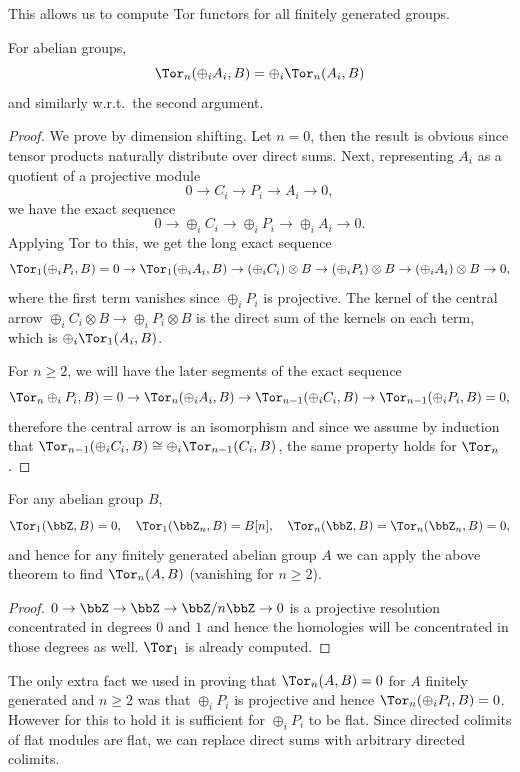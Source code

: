 This allows us to compute Tor functors for all finitely generated groups.

\begin{thm}
    For abelian groups,
    \[\Tor_n(\oplus_i A_i,B)=\oplus_i \Tor_n(A_i,B)\]
    and similarly w.r.t.\ the second argument.
\end{thm}
\begin{proof}
    We prove by dimension shifting. Let $n=0$, then the result is obvious since tensor products naturally distribute over direct sums.
     Next, representing $A_i$ as a quotient of a projective module
     \[0\to C_i\to P_i\to A_i\to 0,\]
     we have the exact sequence
     \[0\to \oplus_i C_i\to \oplus_i P_i\to \oplus_i A_i\to 0.\]
     Applying Tor to this, we get the long exact sequence
     \[\Tor_1(\oplus_i P_i,B)=0\to\Tor_1(\oplus_i A_i,B)\to (\oplus_i C_i)\otimes B\to (\oplus_i P_i)\otimes B\to (\oplus_i A_i)\otimes B\to 0,\]
     where the first term vanishes since $\oplus_i P_i$ is projective. The kernel of the central arrow $\oplus_i C_i\otimes B\to \oplus_i P_i\otimes B$ is the direct sum of the kernels on each term, which is $\oplus_i\Tor_1(A_i,B)$.

     For $n\geq 2$, we will have the later segments of the exact sequence
     \[\Tor_n\oplus_i P_i,B)=0\to \Tor_n(\oplus_iA_i,B)\to \Tor_{n-1}(\oplus_iC_i,B)\to \Tor_{n-1}(\oplus_i P_i,B)=0,\]
     therefore the central arrow is an isomorphism and since we assume by induction that $\Tor_{n-1}(\oplus_iC_i,B)\cong\oplus_i\Tor_{n-1}(C_i,B)$, the same property holds for $\Tor_n$.
\end{proof}
\begin{cor}
    For any abelian group $B$,
    \[\Tor_1(\bbZ,B)=0,\quad \Tor_1(\bbZ_n,B)=B[n],\quad \Tor_n(\bbZ,B)=\Tor_n(\bbZ_n,B)=0,\]
    and hence for any finitely generated abelian group $A$ we can apply the above theorem to find $\Tor_n(A,B)$ (vanishing for $n\geq 2$).
\end{cor}
\begin{proof}
    $0\to \bbZ\to \bbZ\to \bbZ\slash n\bbZ \to 0$ is a projective resolution concentrated in degrees $0$ and $1$ and hence the homologies will be concentrated in those degrees as well. $\Tor_1$ is already computed.
\end{proof}

The only extra fact we used in proving that $\Tor_n(A,B)=0$ for $A$ finitely generated and $n\geq 2$ was that $\oplus_i P_i$ is projective and hence $\Tor_n(\oplus_i P_i,B)=0$. However for this to hold it is sufficient for $\oplus_i P_i$ to be flat. Since directed colimits of flat modules are flat, we can replace direct sums with arbitrary directed colimits.

